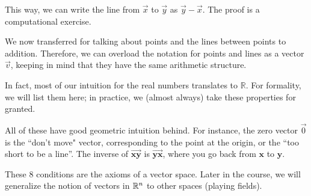 This way, we can write the line from $\vec{x}$ to $\vec{y}$ as $\vec{y}-\vec{x}$. The proof is a computational exercise. \\ 
\begin{notation}
	We now transferred for talking about points and the lines between points to addition. Therefore, we can overload the notation for points and lines as a vector $\vec{v}$, keeping in mind that they have the same arithmetic structure.
\end{notation}


In fact, most of our intuition for the real numbers translates to $\mathbb{R}$. For formality, we will list them here; in practice, we (almost always) take these properties for granted.
\begin{remark}
	All of these have good geometric intuition behind. For instance, the zero vector $\vec{0}$ is the ``don't move" vector, corresponding to the point at the origin, or the ``too short to be a line''. The inverse of $\overrightarrow{\mathbf{xy}}$ is $\overrightarrow{\mathbf{yx}}$, where you go back from $\mathbf{x}$ to $\mathbf{y}$. \begin{tikzpicture}
		
	\end{tikzpicture}
\end{remark}
\begin{remark}
	These $8$ conditions are the axioms of a vector space. Later in the course, we will generalize the notion of vectors in $\reals^n$ to other spaces (playing fields).
\end{remark}
